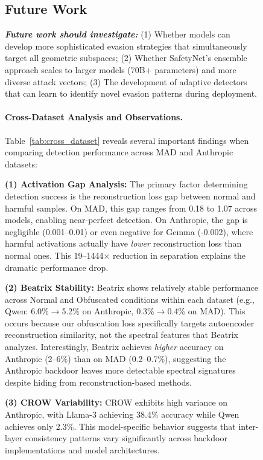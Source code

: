 \begin{figure}[htbp]
{\subsection{Future Work}

\textit{\textbf{Future work should investigate:}} (1) Whether models can develop more sophisticated evasion strategies that simultaneously target all geometric subspaces; (2) Whether SafetyNet's ensemble approach scales to larger models (70B+ parameters) and more diverse attack vectors; (3) The development of adaptive detectors that can learn to identify novel evasion patterns during deployment.

\paragraph{Cross-Dataset Analysis and Observations.}
Table~\ref{tab:cross_dataset} reveals several important findings when comparing detection performance across MAD and Anthropic datasets:

\textbf{(1) Activation Gap Analysis:} The primary factor determining detection success is the reconstruction loss gap between normal and harmful samples. On MAD, this gap ranges from 0.18 to 1.07 across models, enabling near-perfect detection. On Anthropic, the gap is negligible (0.001--0.01) or even negative for Gemma (-0.002), where harmful activations actually have \textit{lower} reconstruction loss than normal ones. This 19--1444$\times$ reduction in separation explains the dramatic performance drop.

\textbf{(2) Beatrix Stability:} Beatrix shows relatively stable performance across Normal and Obfuscated conditions within each dataset (e.g., Qwen: 6.0\%$\rightarrow$5.2\% on Anthropic, 0.3\%$\rightarrow$0.4\% on MAD). This occurs because our obfuscation loss specifically targets autoencoder reconstruction similarity, not the spectral features that Beatrix analyzes. Interestingly, Beatrix achieves \textit{higher} accuracy on Anthropic (2--6\%) than on MAD (0.2--0.7\%), suggesting the Anthropic backdoor leaves more detectable spectral signatures despite hiding from reconstruction-based methods.

\textbf{(3) CROW Variability:} CROW exhibits high variance on Anthropic, with Llama-3 achieving 38.4\% accuracy while Qwen achieves only 2.3\%. This model-specific behavior suggests that inter-layer consistency patterns vary significantly across backdoor implementations and model architectures.

}
\end{figure}
